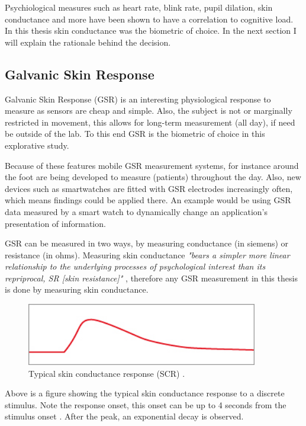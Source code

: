 \documentclass[11pt,leqno,a4paper]{report} %
\begin{document}
Psychiological measures such as heart rate, blink rate, pupil dilation, skin conductance and more have been shown to have a correlation to cognitive load. In this thesis skin conductance was the biometric of choice. In the next section I will explain the rationale behind the decision.


\subsection{Galvanic Skin Response}

Galvanic Skin Response (GSR) is an interesting physiological response to measure as sensors are cheap and simple. Also, the subject is not or marginally restricted in movement, this allows for long-term measurement (all day), if need be outside of the lab. To this end GSR is the biometric of choice in this explorative study.

Because of these features mobile GSR measurement systems, for instance around the foot \citep{Gravenhorst} are being developed to measure (patients) throughout the day. Also, new devices such as smartwatches are fitted with GSR electrodes increasingly often, which means findings could be applied there. An example would be using GSR data measured by a smart watch to dynamically change an application's presentation of information.

GSR can be measured in two ways, by measuring conductance (in siemens) or resistance (in ohms). Measuring skin conductance \textit{"bears a simpler more linear relationship to the underlying processes of psychological interest than its repriprocal, SR [skin resistance]"} \citep{lykken1971direct}, therefore any GSR measurement in this thesis is done by measuring skin conductance.

\begin{figure}[H]
  \centering   
    \includegraphics[width=0.9\textwidth]{gsr.jpg}
  \caption{Typical skin conductance response (SCR) \citep{dow_sc_explained_}.}
\end{figure}

Above is a figure showing the typical skin conductance response to a discrete stimulus. Note the response onset, this onset can be up to 4 seconds from the stimulus onset \citep{dow_sc_explained_}. After the peak, an exponential decay is observed.
\end{document}
